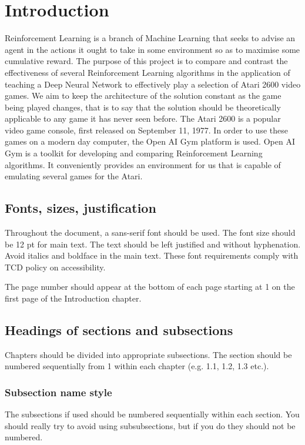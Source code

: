 \chapter{Introduction} Reinforcement Learning is a branch of Machine Learning that seeks to advise an agent in the actions it ought to take in some environment so as to
maximise some cumulative reward. The purpose of this project is to compare and contrast the effectiveness of several Reinforcement Learning algorithms in the application
of teaching a Deep Neural Network to effectively play a selection of Atari 2600 video games. We aim to keep the architecture of the solution constant as the game being
played changes, that is to say that the solution should be theoretically applicable to any game it has never seen before. The Atari 2600 is a popular video game console,
first released on September 11, 1977. In order to use these games on a modern day computer, the Open AI Gym platform is used. Open AI Gym is a toolkit for developing and
comparing Reinforcement Learning algorithms. It conveniently provides an environment for us that is capable of emulating several games for the Atari.

\section{Fonts, sizes, justification}

Throughout the document, a sans-serif font should be used. The font size should be 12 pt for main text. The text should be left justified and without hyphenation. Avoid
italics and boldface in the main text. These font requirements comply with TCD policy on accessibility.

The page number should appear at the bottom of each page starting at 1 on the first page of the Introduction chapter. 

\section{Headings of sections and subsections}
Chapters should be divided into appropriate subsections. The section should be numbered sequentially from 1 within each chapter (e.g. 1.1, 1.2, 1.3 etc.).

\subsection{Subsection name style}
The subsections if used should be numbered sequentially within each section. You should really try to avoid using subsubsections, but if you do they should not be
numbered.

